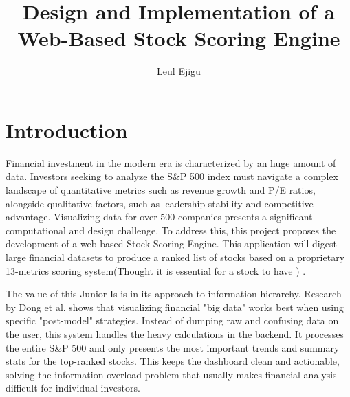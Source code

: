 \documentclass[12pt]{article}
\title{\textbf{Design and Implementation of a Web-Based Stock Scoring Engine}}
\author{Leul Ejigu}
\begin{document}
\maketitle

\section*{Introduction}
Financial investment in the modern era is characterized by an huge  amount of data. Investors seeking to analyze the S\&P 500 index must navigate a complex landscape of quantitative metrics such as revenue growth and P/E ratios, alongside qualitative factors, such as leadership stability and competitive advantage. Visualizing data for over 500 companies presents a significant computational and design challenge. To address this, this project proposes the development of a web-based Stock Scoring Engine. This application will digest large financial datasets to produce a ranked list of stocks based on a proprietary 13-metrics scoring system(Thought it is essential for a stock to have ) .

The value of this Junior Is is in its approach to information hierarchy. Research by Dong et al. shows that visualizing financial "big data" works best when using specific "post-model" strategies. Instead of dumping raw and confusing data on the user, this system handles the heavy calculations in the backend. It processes the entire S\&P 500 and only presents the most important trends and summary stats for the top-ranked stocks. This keeps the dashboard clean and actionable, solving the information overload problem that usually makes financial analysis difficult for individual investors.
\end{document}
